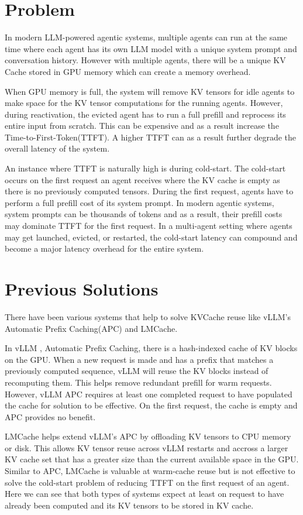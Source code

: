 \documentclass[letterpaper,twocolumn,10pt]{article}
\begin{document}
\section{Problem}
In modern LLM-powered agentic systems, multiple agents can run at the same time where each agent has its own LLM model with a unique system prompt and conversation history. However with multiple agents, there will be a unique KV Cache stored in GPU memory which can create a memory overhead.

When GPU memory is full, the system will remove KV tensors for idle agents to make space for the KV tensor computations for the running agents. However, during reactivation, the evicted agent has to run a full prefill and reprocess its entire input from scratch. This can be expensive and as a result increase the Time-to-First-Token(TTFT). A higher TTFT can as a result further degrade the overall latency of the system.

An instance where TTFT is naturally high is during cold-start. The cold-start occurs on the first request an agent receives where the KV cache is empty as there is no previously computed tensors. During the first request, agents have to perform a full prefill cost of its system prompt. In modern agentic systems, system prompts can be thousands of tokens and as a result, their prefill costs may dominate TTFT for the first request. In a multi-agent setting where agents may get launched, evicted, or restarted, the cold-start latency can compound and become a major latency overhead for the entire system.

\section{Previous Solutions}
There have been various systems that help to solve KVCache reuse like vLLM's Automatic Prefix Caching(APC) and LMCache.

In vLLM \cite{kwon2023efficientmemorymanagementlarge}, Automatic Prefix Caching, there is a hash-indexed cache of KV blocks on the GPU. When a new request is made and has a prefix that matches a previously computed sequence, vLLM will reuse the KV blocks instead of recomputing them. This helps remove redundant prefill for warm requests. However, vLLM APC requires at least one completed request to have populated the cache for solution to be effective. On the first request, the cache is empty and APC provides no benefit.

LMCache \cite{liu2025lmcacheefficientkvcache} helps extend vLLM's APC by offloading KV tensors to CPU memory or disk. This allows KV tensor reuse across vLLM restarts and accross a larger KV cache set that has a greater size than the current available space in the GPU. Similar to APC, LMCache is valuable at warm-cache reuse but is not effective to solve the cold-start problem of reducing TTFT on the first request of an agent. Here we can see that both types of systems expect at least on request to have already been computed and its KV tensors to be stored in KV cache.
\end{document}
